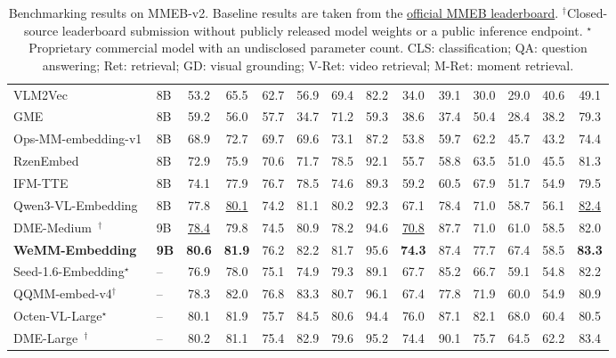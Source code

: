 \documentclass[]{wechat}
\begin{document}
\begin{table}[t]
{\begin{tabular}{ll c ccccc ccccc c}
\midrule
VLM2Vec~\cite{vlm2vec2024} & 8B & 53.2 & 65.5 & 62.7 & 56.9 & 69.4 & 82.2 & 34.0 & 39.1 & 30.0 & 29.0 & 40.6 & 49.1 \\
GME~\cite{zhang2024gme} & 8B & 59.2 & 56.0 & 57.7 & 34.7 & 71.2 & 59.3 & 38.6 & 37.4 & 50.4 & 28.4 & 38.2 & 79.3 \\
Ops-MM-embedding-v1 & 8B & 68.9 & 72.7 & 69.7 & 69.6 & 73.1 & 87.2 & 53.8 & 59.7 & 62.2 & 45.7 & 43.2 & 74.4 \\
RzenEmbed~\cite{jian2025rzenembed} & 8B & 72.9 & 75.9 & 70.6 & 71.7 & 78.5 & 92.1 & 55.7 & 58.8 & 63.5 & 51.0 & 45.5 & 81.3 \\
IFM-TTE~\cite{tte} & 8B & 74.1 & 77.9 & 76.7 & 78.5 & 74.6 & 89.3 & 59.2 & 60.5 & 67.9 & 51.7 & 54.9 & 79.5 \\
Qwen3-VL-Embedding~\cite{qwen3vl-emb} & 8B & 77.8 & \underline{80.1} & 74.2 & 81.1 & 80.2 & 92.3 & 67.1 & 78.4 & 71.0 & 58.7 & 56.1 & \underline{82.4} \\
DME-Medium~\cite{DME}$^{\dagger}$ & 9B & \underline{78.4} & 79.8 & 74.5 & 80.9 & 78.2 & 94.6 & \underline{70.8} & 87.7 & 71.0 & 61.0 & 58.5 & 82.0 \\
\rowcolor{gray!10}\textbf{WeMM-Embedding} & \textbf{9B} & \textbf{80.6} & \textbf{81.9} & 76.2 & 82.2 & 81.7 & 95.6 & \textbf{74.3} & 87.4 & 77.7 & 67.4 & 58.5 & \textbf{83.3} \\
\midrule
Seed-1.6-Embedding$^{\star}$ & -- & 76.9 & 78.0 & 75.1 & 74.9 & 79.3 & 89.1 & 67.7 & 85.2 & 66.7 & 59.1 & 54.8 & 82.2 \\
QQMM-embed-v4$^{\dagger}$ & -- & 78.3 & 82.0 & 76.8 & 83.3 & 80.7 & 96.1 & 67.4 & 77.8 & 71.9 & 60.0 & 54.9 & 80.9 \\
Octen-VL-Large$^{\star}$ & -- & 80.1 & 81.9 & 75.7 & 84.5 & 80.6 & 94.4 & 76.0 & 87.1 & 82.1 & 68.0 & 60.4 & 80.5 \\
DME-Large~\cite{DME}$^{\dagger}$ & -- & 80.2 & 81.1 & 75.4 & 82.9 & 79.6 & 95.2 & 74.4 & 90.1 & 75.7 & 64.5 & 62.2 & 83.4 \\
\bottomrule
\end{tabular}%
}
\caption{Benchmarking results on MMEB-v2. Baseline results are taken from the \href{https://huggingface.co/spaces/TIGER-Lab/MMEB-Leaderboard}{official MMEB leaderboard}. 
$^{\dagger}$Closed-source leaderboard submission without publicly released model weights or a public inference endpoint. $^{\star}$Proprietary commercial model with an undisclosed parameter count. CLS: classification; QA: question answering; Ret: retrieval; GD: visual grounding; V-Ret: video retrieval; M-Ret: moment retrieval.}
\label{tab:mmeb_v2}
\end{table}
\end{document}
